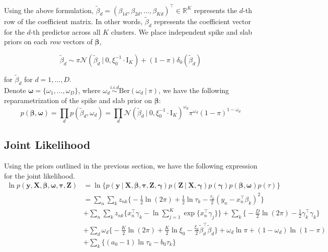 \documentclass[twoside,11pt]{article}
\newcommand\given[1][]{\:#1\vert\:}
\newcommand{\transpose}[1]{#1^{\intercal}}
\newcommand{\R}{\mathbb{R}}
\newcommand{\nsum}{\sum\limits_{n}}
\newcommand{\ksum}{\sum\limits_{k}}
\newcommand{\boldbeta}{\boldsymbol\beta}
\newcommand{\boldgamma}{\boldsymbol\gamma}
\newcommand{\boldtau}{\boldsymbol\tau}
\newcommand{\sumexp}{\sum_{j=1}^{K} \exp \{ \transpose{x_n} \gamma_j \}}
\newcommand{\iid}{\overset{i.i.d}{\sim}}
\newcommand{\betad}{\tilde{\beta}_d}
\newcommand{\priorbeta}{\mathcal{N} \left( \betad \given 0, \xi_0^{-1} \cdot \mathrm{I}_K \right)}
\newcommand{\pr}[1]{p \left( #1 \right)}
\begin{document}
Using the above formulation, $\betad = \transpose{\left( \beta_{1d}, \beta_{2d}, \ldots, \beta_{Kd}\right)} \in \R^K$ represents the $d$-th row of the coefficient matrix. In other words, $\betad$ represents the coefficient vector for the $d$-th predictor across all $K$ clusters. We place independent spike and slab priors on each \textit{row} vectors of $\boldbeta$, 

\begin{equation} 
	\betad \sim \pi \priorbeta + (1 - \pi) \delta_0 (\betad)
\end{equation}

for $\betad$ for $d = 1, \ldots, D$. \\

Denote $\boldsymbol \omega = \{ \omega_1, \ldots, \omega_D\}$, where $\omega_d \iid \mathrm{Ber}(\omega_d \given \pi)$, we have the following reparametrization of the spike and slab prior on $\boldbeta$:
\begin{equation} \label{eq:beta_joint_prior_vs}
	\pr{\boldbeta, \boldsymbol\omega} = \prod_{d} \pr{\betad, \omega_d} = \prod_{d} \priorbeta^{\omega_d} \pi^{\omega_d} (1-\pi)^{1 - \omega_d}
\end{equation}

\subsection{Joint Likelihood}
Using the priors outlined in the previous section, we have the following expression for the joint likelihood. 
\begin{equation} \label{eq:joint_vs}
\begin{split}
	\ln  \pr{\mathbf{y}, \mathbf{X}, \boldbeta, \boldsymbol\omega, \boldtau, \mathbf{Z}} &= 
	\ln \bigg\{\pr{\mathbf{y} \given \mathbf{X}, \boldsymbol\beta, \boldsymbol{\tau}, \mathbf{Z}, \boldsymbol\gamma}\pr{\mathbf{Z}\given \mathbf{X}, \boldgamma}\pr{\boldgamma}\pr{\boldbeta, \boldsymbol\omega}\pr{\tau} \bigg\}\\
	&= \nsum \ksum z_{nk}\bigg\{ -\frac{1}{2}\ln(2\pi) + \frac{1}{2} \ln \tau_k - \frac{\tau_k}{2} \left( y_n - \transpose{x_n}\beta_k\right)^2 \bigg\} \\
	& + \nsum \ksum z_{nk} \bigg\{ \transpose{x_n} \gamma_k - \ln \sumexp  \bigg\} + \ksum \bigg\{ -\frac{D}{2} \ln (2\pi) - \frac{1}{2} \transpose{\gamma_k}\gamma_k \bigg\} \\
	& + \sum_{d} \omega_d \bigg\{ -\frac{K}{2} \ln(2\pi) + \frac{K}{2} \ln \xi_0 - \frac{\xi_0}{2} \transpose{\betad} \betad\bigg\} + \omega_d \ln \pi + ( 1- \omega_d) \ln(1 - \pi) \\
	& + \ksum \bigg\{ (a_0 - 1) \ln \tau_k - b_0 \tau_k \bigg\}
\end{split}
\end{equation}
\end{document}
